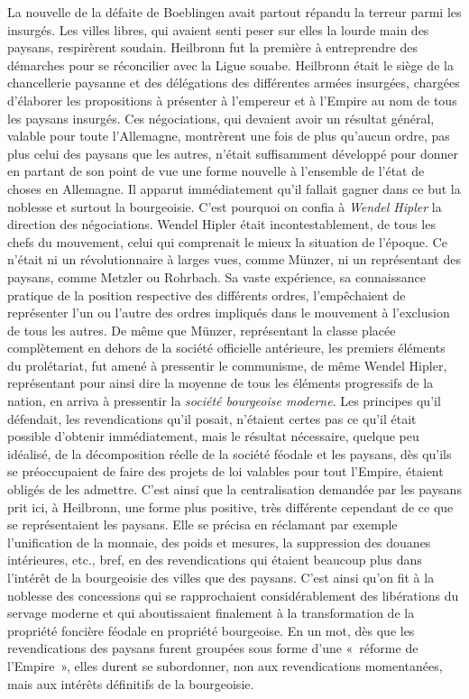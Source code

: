 \documentclass[french,twoside]{book} %
\begin{document}
La nouvelle de la défaite de Boeblingen avait partout répandu la terreur parmi les insurgés. Les villes libres, qui avaient senti peser sur elles la lourde main des paysans, respirèrent soudain. Heilbronn fut la première à entreprendre des démarches pour se réconcilier avec la Ligue souabe. Heilbronn était le siège de la chancellerie paysanne et des délégations des différentes armées insurgées, chargées d’élaborer les propositions à présenter à l’empereur et à l’Empire au nom de tous les paysans insurgés. Ces négociations, qui devaient avoir un résultat général, valable pour toute l’Allemagne, montrèrent une fois de plus qu’aucun ordre, pas plus celui des paysans que les autres, n’était suffisamment développé pour donner en partant de son point de vue une forme nouvelle à l’ensemble de l’état de choses en Allemagne. Il apparut immédiatement qu’il fallait gagner dans ce but la noblesse et surtout la bourgeoisie. C’est pourquoi on confia à \emph{Wendel Hipler} la direction des négociations. Wendel Hipler était incontestablement, de tous les chefs du mouvement, celui qui comprenait le mieux la situation de l’époque. Ce n’était ni un révolutionnaire à larges vues, comme Münzer, ni un représentant des paysans, comme Metzler ou Rohrbach. Sa vaste expérience, sa connaissance pratique de la position respective des différents ordres, l’empêchaient de représenter l’un ou l’autre des ordres impliqués dans le mouvement à l’exclusion de tous les autres. De même que Münzer, représentant la classe placée complètement en dehors de la société officielle antérieure, les premiers éléments du prolétariat, fut amené à pressentir le communisme, de même Wendel Hipler, représentant pour ainsi dire la moyenne de tous les éléments progressifs de la nation, en arriva à pressentir la \emph{société bourgeoise moderne}. Les principes qu’il défendait, les revendications qu’il posait, n’étaient certes pas ce qu’il était possible d’obtenir immédiatement, mais le résultat nécessaire, quelque peu idéalisé, de la décomposition réelle de la société féodale et les paysans, dès qu’ils se préoccupaient de faire des projets de loi valables pour tout l’Empire, étaient obligés de les admettre. C’est ainsi que la centralisation demandée par les paysans prit ici, à Heilbronn, une forme plus positive, très différente cependant de ce que se représentaient les paysans. Elle se précisa en réclamant par exemple l’unification de la monnaie, des poids et mesures, la suppression des douanes intérieures, etc., bref, en des revendications qui étaient beaucoup plus dans l’intérêt de la bourgeoisie des villes que des paysans. C’est ainsi qu’on fit à la noblesse des concessions qui se rapprochaient considérablement des libérations du servage moderne et qui aboutissaient finalement à la transformation de la propriété foncière féodale en propriété bourgeoise. En un mot, dès que les revendications des paysans furent groupées sous forme d’une « réforme de l’Empire », elles durent se subordonner, non aux revendications momentanées, mais aux intérêts définitifs de la bourgeoisie.\par
\end{document}
